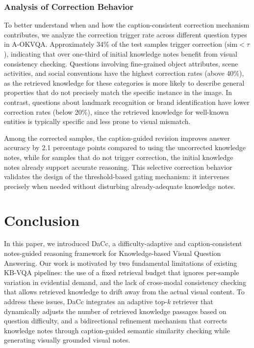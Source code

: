 \documentclass[manuscript,screen,review]{acmart}
\begin{document}
\subsubsection{Analysis of Correction Behavior}

To better understand when and how the caption-consistent correction mechanism contributes, we analyze the correction trigger rate across different question types in A-OKVQA. Approximately 34\% of the test samples trigger correction ($\text{sim} < \tau$), indicating that over one-third of initial knowledge notes benefit from visual consistency checking. Questions involving fine-grained object attributes, scene activities, and social conventions have the highest correction rates (above 40\%), as the retrieved knowledge for these categories is more likely to describe general properties that do not precisely match the specific instance in the image. In contrast, questions about landmark recognition or brand identification have lower correction rates (below 20\%), since the retrieved knowledge for well-known entities is typically specific and less prone to visual mismatch.

Among the corrected samples, the caption-guided revision improves answer accuracy by 2.1 percentage points compared to using the uncorrected knowledge notes, while for samples that do not trigger correction, the initial knowledge notes already support accurate reasoning. This selective correction behavior validates the design of the threshold-based gating mechanism: it intervenes precisely when needed without disturbing already-adequate knowledge notes.

\section{Conclusion}

In this paper, we introduced DaCc, a difficulty-adaptive and caption-consistent notes-guided reasoning framework for Knowledge-based Visual Question Answering. Our work is motivated by two fundamental limitations of existing KB-VQA pipelines: the use of a fixed retrieval budget that ignores per-sample variation in evidential demand, and the lack of cross-modal consistency checking that allows retrieved knowledge to drift away from the actual visual content. To address these issues, DaCc integrates an adaptive top-$k$ retriever that dynamically adjusts the number of retrieved knowledge passages based on question difficulty, and a bidirectional refinement mechanism that corrects knowledge notes through caption-guided semantic similarity checking while generating visually grounded visual notes.
\end{document}
